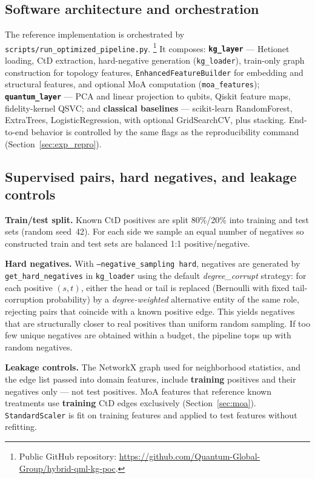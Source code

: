 \documentclass[10pt,twocolumn]{article}
\begin{document}
\subsection{Software architecture and orchestration}

The reference implementation is orchestrated by
\texttt{scripts/run\_optimized\_pipeline.py}.%
\footnote{Public GitHub repository:
\url{https://github.com/Quantum-Global-Group/hybrid-qml-kg-poc}.}
It composes: \textbf{\texttt{kg\_layer}} --- Hetionet loading, CtD extraction, hard-negative generation (\texttt{kg\_loader}), train-only graph construction for topology features, \texttt{EnhancedFeatureBuilder} for embedding and structural features, and optional MoA computation (\texttt{moa\_features}); \textbf{\texttt{quantum\_layer}} --- PCA and linear projection to qubits, Qiskit feature maps, fidelity-kernel QSVC; and \textbf{classical baselines} --- scikit-learn RandomForest, ExtraTrees, LogisticRegression, with optional GridSearchCV, plus stacking. End-to-end behavior is controlled by the same flags as the reproducibility command (Section~\ref{sec:exp_repro}).

\subsection{Supervised pairs, hard negatives, and leakage controls}

\textbf{Train/test split.} Known CtD positives are split 80\%/20\% into training and test sets (random seed~42). For each side we sample an equal number of negatives so constructed train and test sets are balanced 1:1 positive/negative.

\textbf{Hard negatives.} With \texttt{--negative\_sampling hard}, negatives are generated by \texttt{get\_hard\_negatives} in \texttt{kg\_loader} using the default \textit{degree\_corrupt} strategy: for each positive $(s,t)$, either the head or tail is replaced (Bernoulli with fixed tail-corruption probability) by a \emph{degree-weighted} alternative entity of the same role, rejecting pairs that coincide with a known positive edge. This yields negatives that are structurally closer to real positives than uniform random sampling. If too few unique negatives are obtained within a budget, the pipeline tops up with random negatives.

\textbf{Leakage controls.} The NetworkX graph used for neighborhood statistics, and the edge list passed into domain features, include \textbf{training} positives and their negatives only --- not test positives. MoA features that reference known treatments use \textbf{training} CtD edges exclusively (Section~\ref{sec:moa}). \texttt{StandardScaler} is fit on training features and applied to test features without refitting.
\end{document}
